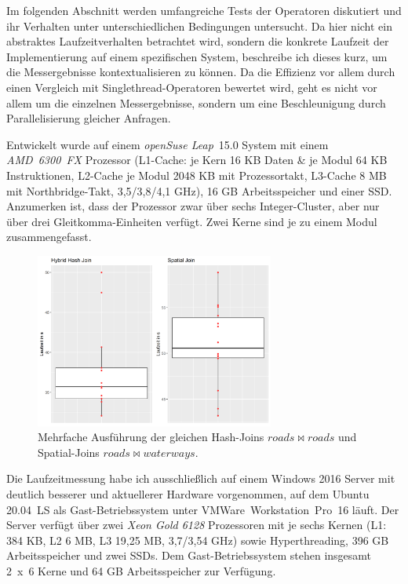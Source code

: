 \documentclass[a4paper,12pt,twoside]{article}
\newcommand{\Fb}[1]{\textit{#1}} %
\begin{document}
Im folgenden Abschnitt werden umfangreiche Tests der Operatoren diskutiert und ihr Verhalten unter unterschiedlichen Bedingungen untersucht. Da hier nicht ein abstraktes Laufzeitverhalten betrachtet wird, sondern die konkrete Laufzeit der Implementierung auf einem spezifischen System, beschreibe ich dieses kurz, um die Messergebnisse kontextualisieren zu können. Da die Effizienz vor allem durch einen Vergleich mit Singlethread-Operatoren bewertet wird, geht es nicht vor allem um die einzelnen Messergebnisse, sondern um eine Beschleunigung durch Parallelisierung gleicher Anfragen. 

Entwickelt wurde auf einem \Fb{openSuse Leap}~15.0 System mit einem \Fb{AMD~6300~FX} Prozessor (L1-Cache: je Kern 16 KB Daten \& je Modul 64 KB Instruktionen, L2-Cache je Modul 2048 KB mit Prozessortakt, L3-Cache 8 MB mit Northbridge-Takt, 3,5/3,8/4,1 GHz), 16 GB Arbeitsspeicher und einer SSD. Anzumerken ist, dass der Prozessor zwar über
sechs Integer-Cluster, aber nur über drei Gleitkomma-Einheiten verfügt. Zwei Kerne sind je zu einem Modul zusammengefasst.

\begin{figure}
	\centering
	\includegraphics[width=0.70\textwidth]{Bilder/streuung.png}
	\caption{Mehrfache Ausführung der gleichen Hash-Joins $roads \bowtie roads$ und Spatial-Joins $roads \bowtie waterways$.}
	\label{img:streuung}
\end{figure}

Die Laufzeitmessung  habe ich ausschließlich auf einem Windows 2016 Server mit deutlich besserer und aktuellerer Hardware vorgenommen, auf dem Ubuntu 20.04~LS als Gast-Betriebssystem unter VMWare~Workstation~Pro~16 läuft. Der Server verfügt über zwei \Fb{Xeon Gold 6128} Prozessoren mit je sechs Kernen (L1: 384 KB, L2 6 MB, L3 19,25 MB, 3,7/3,54 GHz) sowie Hyperthreading, 396 GB Arbeitsspeicher und zwei SSDs. Dem Gast-Betriebssystem stehen insgesamt 2~x~6 Kerne und 64 GB Arbeitsspeicher zur Verfügung.
\end{document}
